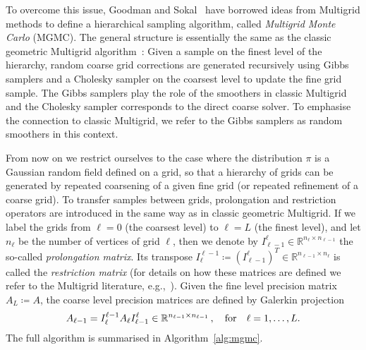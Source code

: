 \documentclass[
fontsize=11pt,
paper=a4,
numbers=noenddot
]{scrartcl}
\begin{document}
To overcome this issue, Goodman and Sokal~\cite{goodmansokal} have borrowed ideas from Multigrid methods to define a hierarchical sampling algorithm, called \emph{Multigrid Monte Carlo} (MGMC). The general structure is essentially the same as the classic geometric Multigrid algorithm~\cite{hackbuschMultiGridMethodsApplications1985}: Given a sample on the finest level of the hierarchy, random coarse grid corrections are generated recursively using Gibbs samplers and a Cholesky sampler on the coarsest level to update the fine grid sample. The Gibbs samplers play the role of the smoothers in classic Multigrid and the Cholesky sampler corresponds to the direct coarse solver. To emphasise the connection to classic Multigrid, we refer to the Gibbs samplers as random smoothers in this context. 

From now on we restrict ourselves to the case where the distribution $\pi$ is a Gaussian random field defined on a grid, so that a hierarchy of grids can be generated by repeated coarsening of a given fine grid (or repeated refinement of a coarse grid). To transfer samples between grids, prolongation and restriction operators are introduced in the same way as in classic  geometric Multigrid. If we label the grids from $\ell = 0$ (the coarsest level) to $\ell = L$ (the finest level), and let $n_\ell$ be the number of vertices of grid $\ell$, then we denote by $I_{\ell-1}^\ell \in \mathbb{R}^{n_\ell \times n_{\ell - 1}}$ the so-called \emph{prolongation matrix}. Its transpose $I_{\ell}^{\ell-1} \coloneqq {(I_{\ell-1}^\ell)}^T \in \mathbb{R}^{n_{\ell - 1} \times n_{\ell}}$ is called the \emph{restriction matrix} (for details on how these matrices are defined we refer to the Multigrid literature, e.g.,~\cite{hackbuschMultiGridMethodsApplications1985}). Given the fine level precision matrix $A_L \coloneqq A$, the coarse level precision matrices are defined by Galerkin projection
\begin{equation*}
    A_{\ell-1} = I_\ell^{\ell - 1} A_\ell I_{\ell-1}^\ell \in \mathbb{R}^{n_{\ell-1} \times n_{\ell-1}}\,, \quad \text{for\quad$\ell = 1, \dotsc, L$.}
\end{equation*}
The full algorithm is summarised in Algorithm~\ref{alg:mgmc}.
\end{document}
